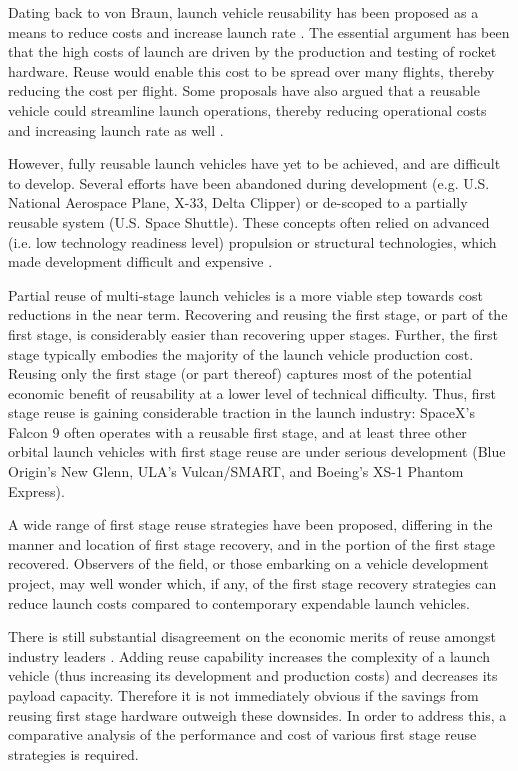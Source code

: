 \documentclass{iaf-iac}
\begin{document}
\begin{multicols}{2}
Dating back to von Braun, launch vehicle reusability has been proposed as a means to reduce costs and increase launch rate \cite{vonBraun52}. The essential argument has been that the high costs of launch are driven by the production and testing of rocket hardware. Reuse would enable this cost to be spread over many flights, thereby reducing the cost per flight. Some proposals have also argued that a reusable vehicle could streamline launch operations, thereby reducing operational costs and increasing launch rate as well \cite{Butrica03}.

However, fully reusable launch vehicles have yet to be achieved, and are difficult to develop. Several efforts have been abandoned during development (e.g. U.S. National Aerospace Plane, X-33, Delta Clipper) or de-scoped to a partially reusable system (U.S. Space Shuttle). These concepts often relied on advanced (i.e. low technology readiness level) propulsion or structural technologies, which made development difficult and expensive \cite{Butrica03}.

Partial reuse of multi-stage launch vehicles is a more viable step towards cost reductions in the near term. Recovering and reusing the first stage, or part of the first stage, is considerably easier than recovering upper stages. Further, the first stage typically embodies the majority of the launch vehicle production cost. Reusing only the first stage (or part thereof) captures most of the potential economic benefit of reusability at a lower level of technical difficulty. Thus, first stage reuse is gaining considerable traction in the launch industry: SpaceX's Falcon 9 often operates with a reusable first stage, and at least three other orbital launch vehicles with first stage reuse are under serious development (Blue Origin's New Glenn, ULA's Vulcan/SMART, and Boeing's XS-1 Phantom Express).

A wide range of first stage reuse strategies have been proposed, differing in the manner and location of first stage recovery, and in the portion of the first stage recovered. Observers of the field, or those embarking on a vehicle development project, may well wonder which, if any, of the first stage recovery strategies can reduce launch costs compared to contemporary expendable launch vehicles. 

There is still substantial disagreement on the economic merits of reuse amongst industry leaders \cite{Cantrell17, Russell18, Selding16_orbital, Wall15, Selding16_spacex}. Adding reuse capability increases the complexity of a launch vehicle (thus increasing its development and production costs) and decreases its payload capacity. Therefore it is not immediately obvious if the savings from reusing first stage hardware outweigh these downsides. In order to address this, a comparative analysis of the performance and cost of various first stage reuse strategies is required. 


\end{multicols}
\end{document}
